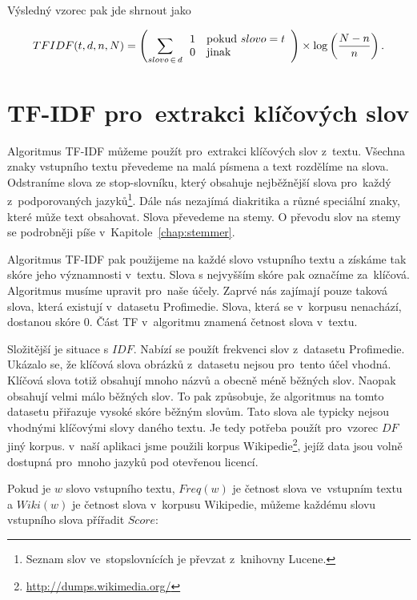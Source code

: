 Výsledný vzorec pak jde shrnout jako

\begin{equation}
TFIDF(t,d,n,N)= \left(\sum_{slovo\,\in\,d} \begin{array}{l l} 1 & \mathrm{pokud}\ slovo = t \\
  0 & \mathrm{jinak} \end{array}\right)
  \times
  \log \left(\frac{N - n}{n}\right).
\end{equation}

\section{TF-IDF pro~extrakci klíčových slov}
\label{sec:keywords_extraction}

Algoritmus TF-IDF můžeme použít pro~extrakci klíčových slov z~textu. Všechna znaky vstupního textu převedeme na malá písmena a text rozdělíme na slova. Odstraníme slova ze stop-slovníku, který obsahuje nejběžnější slova pro~každý z~podporovaných jazyků\footnote{Seznam slov ve~stopslovnících je převzat z~knihovny Lucene\cite{lucene}.}. Dále nás nezajímá diakritika a různé speciální znaky, které může text obsahovat.  Slova převedeme na stemy. O převodu slov na stemy se podrobněji píše v~Kapitole~\ref{chap:stemmer}.

Algoritmus TF-IDF pak použijeme na každé slovo vstupního textu a získáme tak skóre jeho významnosti v~textu. Slova s nejvyšším skóre pak označíme za~klíčová. Algoritmus musíme upravit pro~naše účely. Zaprvé nás zajímají pouze taková slova, která existují v~datasetu Profimedie. Slova, která se v~korpusu nenachází, dostanou skóre $0$. Část TF v~algoritmu znamená četnost slova v~textu.

Složitější je situace s $IDF$. Nabízí se použít frekvenci slov z~datasetu Profimedie. Ukázalo se, že klíčová slova obrázků z~datasetu nejsou pro~tento účel vhodná. Klíčová slova totiž obsahují mnoho názvů a obecně méně běžných slov. Naopak obsahují velmi málo běžných slov. To pak způsobuje, že algoritmus na tomto datasetu přiřazuje vysoké skóre běžným slovům. Tato slova ale typicky nejsou vhodnými klíčovými slovy daného textu. Je tedy potřeba použít pro~vzorec $DF$ jiný korpus. v~naší aplikaci jsme použili korpus Wikipedie\footnote{\url{http://dumps.wikimedia.org/}}, jejíž data jsou volně dostupná pro~mnoho jazyků pod otevřenou licencí.

Pokud je $w$ slovo vstupního textu, $Freq(w)$ je četnost slova ve~vstupním textu a $Wiki(w)$ je četnost slova v~korpusu Wikipedie, můžeme každému slovu vstupního slova přířadit $Score$:


